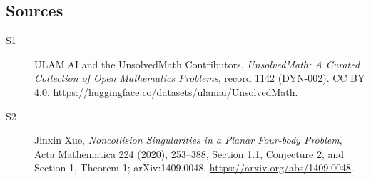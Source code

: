 \documentclass[11pt]{article}
\begin{document}
\subsection{Sources}
\begin{description}
\item[\hypertarget{source:1142:1}{S1}] ULAM.AI and the UnsolvedMath Contributors, \emph{UnsolvedMath: A Curated Collection of Open Mathematics Problems}, record 1142 (DYN-002). CC BY 4.0. \url{https://huggingface.co/datasets/ulamai/UnsolvedMath}.
\item[\hypertarget{source:1142:2}{S2}] Jinxin Xue, \emph{Noncollision Singularities in a Planar Four-body Problem}, Acta Mathematica 224 (2020), 253--388, Section 1.1, Conjecture 2, and Section 1, Theorem 1; arXiv:1409.0048. \url{https://arxiv.org/abs/1409.0048}.
\end{description}
\label{end:1142}
\end{document}
